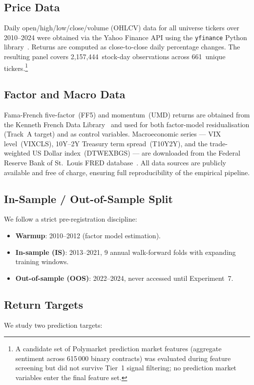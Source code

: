 \documentclass[journal]{IEEEtran}
\begin{document}
\subsection{Price Data}
Daily open/high/low/close/volume (OHLCV) data for all universe
tickers over 2010--2024 were obtained via the Yahoo Finance API
using the \texttt{yfinance} Python library~\citep{yfinance}.
Returns are computed as close-to-close daily percentage changes.
The resulting panel covers 2,157,444~stock-day observations across
661~unique tickers.\footnote{A candidate set of Polymarket
prediction market features (aggregate sentiment across 615\,000
binary contracts) was evaluated during feature screening but did not
survive Tier~1 signal filtering; no prediction market variables
enter the final feature set.}

\subsection{Factor and Macro Data}
Fama-French five-factor~(FF5) and momentum~(UMD) returns are
obtained from the Kenneth French Data
Library~\citep{french_data_library} and used for both
factor-model residualisation (Track~A target) and as control
variables.
Macroeconomic series --- VIX level~(VIXCLS), 10Y--2Y Treasury
term spread~(T10Y2Y), and the trade-weighted US Dollar
index~(DTWEXBGS) --- are downloaded from the Federal Reserve Bank
of St.\ Louis FRED database~\citep{fred2024}.
All data sources are publicly available and free of charge,
ensuring full reproducibility of the empirical pipeline.

\subsection{In-Sample / Out-of-Sample Split}
We follow a strict pre-registration discipline:
\begin{itemize}
  \item \textbf{Warmup}: 2010--2012 (factor model estimation).
  \item \textbf{In-sample (IS)}: 2013--2021, 9 annual walk-forward
        folds with expanding training windows.
  \item \textbf{Out-of-sample (OOS)}: 2022--2024, never accessed
        until Experiment~7.
\end{itemize}

\subsection{Return Targets}
We study two prediction targets:
\end{document}
